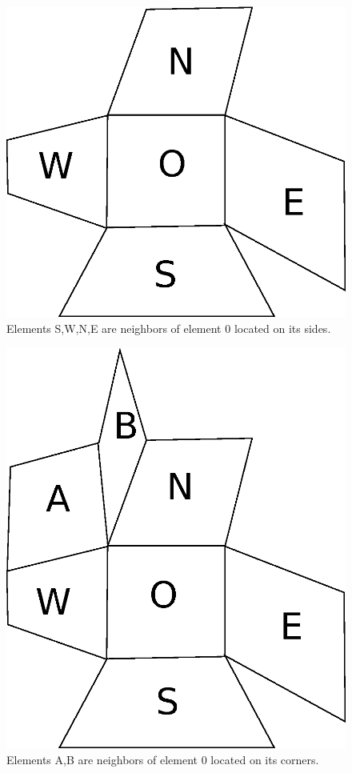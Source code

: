 \begin{figure}
\centering
\includegraphics[scale=.45]{images/mono_cpu_data_structures_element_neigh}
\caption{Elements S,W,N,E are neighbors of element 0 located on its sides.}
\label{fig:element_neigh}
\end{figure}

\begin{figure}
\centering
\includegraphics[scale=.45]{images/mono_cpu_data_structures_element_corner}
\caption{Elements A,B are neighbors of element 0 located on its corners.}
\label{fig:element_corner}
\end{figure}

